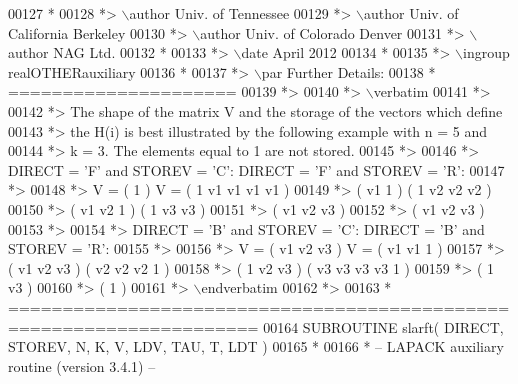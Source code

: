 \begin{DoxyCode}
00127 \textcolor{comment}{*}
00128 \textcolor{comment}{*> \(\backslash\)author Univ. of Tennessee }
00129 \textcolor{comment}{*> \(\backslash\)author Univ. of California Berkeley }
00130 \textcolor{comment}{*> \(\backslash\)author Univ. of Colorado Denver }
00131 \textcolor{comment}{*> \(\backslash\)author NAG Ltd. }
00132 \textcolor{comment}{*}
00133 \textcolor{comment}{*> \(\backslash\)date April 2012}
00134 \textcolor{comment}{*}
00135 \textcolor{comment}{*> \(\backslash\)ingroup realOTHERauxiliary}
00136 \textcolor{comment}{*}
00137 \textcolor{comment}{*> \(\backslash\)par Further Details:}
00138 \textcolor{comment}{*  =====================}
00139 \textcolor{comment}{*>}
00140 \textcolor{comment}{*> \(\backslash\)verbatim}
00141 \textcolor{comment}{*>}
00142 \textcolor{comment}{*>  The shape of the matrix V and the storage of the vectors which define}
00143 \textcolor{comment}{*>  the H(i) is best illustrated by the following example with n = 5 and}
00144 \textcolor{comment}{*>  k = 3. The elements equal to 1 are not stored.}
00145 \textcolor{comment}{*>}
00146 \textcolor{comment}{*>  DIRECT = 'F' and STOREV = 'C':         DIRECT = 'F' and STOREV = 'R':}
00147 \textcolor{comment}{*>}
00148 \textcolor{comment}{*>               V = (  1       )                 V = (  1 v1 v1 v1 v1 )}
00149 \textcolor{comment}{*>                   ( v1  1    )                     (     1 v2 v2 v2 )}
00150 \textcolor{comment}{*>                   ( v1 v2  1 )                     (        1 v3 v3 )}
00151 \textcolor{comment}{*>                   ( v1 v2 v3 )}
00152 \textcolor{comment}{*>                   ( v1 v2 v3 )}
00153 \textcolor{comment}{*>}
00154 \textcolor{comment}{*>  DIRECT = 'B' and STOREV = 'C':         DIRECT = 'B' and STOREV = 'R':}
00155 \textcolor{comment}{*>}
00156 \textcolor{comment}{*>               V = ( v1 v2 v3 )                 V = ( v1 v1  1       )}
00157 \textcolor{comment}{*>                   ( v1 v2 v3 )                     ( v2 v2 v2  1    )}
00158 \textcolor{comment}{*>                   (  1 v2 v3 )                     ( v3 v3 v3 v3  1 )}
00159 \textcolor{comment}{*>                   (     1 v3 )}
00160 \textcolor{comment}{*>                   (        1 )}
00161 \textcolor{comment}{*> \(\backslash\)endverbatim}
00162 \textcolor{comment}{*>}
00163 \textcolor{comment}{*  =====================================================================}
00164 \textcolor{keyword}{      SUBROUTINE }slarft( DIRECT, STOREV, N, K, V, LDV, TAU, T, LDT )
00165 \textcolor{comment}{*}
00166 \textcolor{comment}{*  -- LAPACK auxiliary routine (version 3.4.1) --}

\end{DoxyCode}
